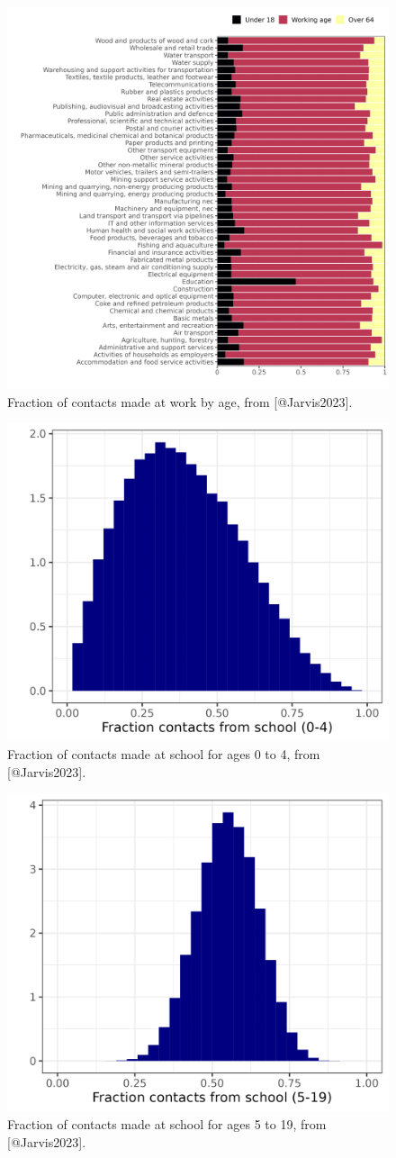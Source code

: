 \documentclass[
]{article}
\begin{document}
\begin{figure}
\includegraphics[width=0.5\linewidth]{README_files/figure-gfm/uksec_dist_age} \caption{Fraction of contacts made at work by age, from [@Jarvis2023].}\label{fig:uksecdistage}
\end{figure}

\begin{figure}
\includegraphics[width=0.5\linewidth]{README_files/figure-gfm/school1frac} \caption{Fraction of contacts made at school for ages 0 to 4, from [@Jarvis2023].}\label{fig:school1frac}
\end{figure}

\begin{figure}
\includegraphics[width=0.5\linewidth]{README_files/figure-gfm/school2frac} \caption{Fraction of contacts made at school for ages 5 to 19, from [@Jarvis2023].}\label{fig:school2frac}
\end{figure}
\end{document}
